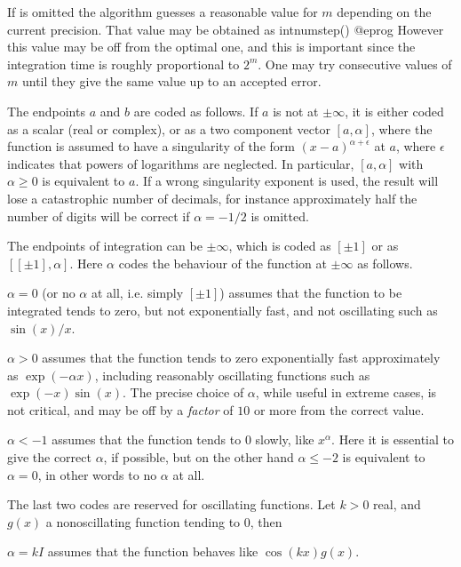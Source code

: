 If  is omitted the algorithm guesses a reasonable value for $m$
depending on the current precision. That value may be obtained as
\bprog
  intnumstep()
@eprog\noindent
However this value may be off from the optimal one, and this is important
since the integration time is roughly proportional to $2^m$. One may try
consecutive values of $m$ until they give the same value up to an accepted
error.

The endpoints $a$ and $b$ are coded as follows. If $a$ is not at $\pm\infty$,
it is either coded as a scalar (real or complex), or as a two component vector
$[a,\alpha]$, where the function is assumed to have a singularity of the
form $(x-a)^{\alpha+\epsilon}$ at $a$, where $\epsilon$ indicates that powers
of logarithms are neglected. In particular, $[a,\alpha]$ with $\alpha\ge 0$
is equivalent to $a$. If a wrong singularity exponent is used, the result
will lose a catastrophic number of decimals, for instance approximately half
the number of digits will be correct if $\alpha=-1/2$ is omitted.

The endpoints of integration can be $\pm\infty$, which is coded as
$[\pm 1]$ or as $[[\pm1],\alpha]$. Here $\alpha$ codes the behaviour of the
function at $\pm\infty$ as follows.

\item $\alpha=0$ (or no $\alpha$ at all, i.e. simply $[\pm1]$) assumes that the
function to be integrated tends to zero, but not exponentially fast, and not
oscillating such as $\sin(x)/x$.

\item $\alpha>0$ assumes that the function tends to zero exponentially fast
approximately as $\exp(-\alpha x)$, including reasonably oscillating
functions such as $\exp(-x)\sin(x)$. The precise choice of $\alpha$, while
useful in extreme cases, is not critical, and may be off by a \emph{factor}
of $10$ or more from the correct value.

\item $\alpha<-1$ assumes that the function tends to $0$ slowly, like
$x^{\alpha}$. Here it is essential to give the correct $\alpha$, if possible,
but on the other hand $\alpha\le -2$ is equivalent to $\alpha=0$, in other
words to no $\alpha$ at all.

\smallskip The last two codes are reserved for oscillating functions.
Let $k > 0$ real, and $g(x)$ a nonoscillating function tending to $0$, then

\item $\alpha=k I$ assumes that the function behaves like $\cos(kx)g(x)$.

